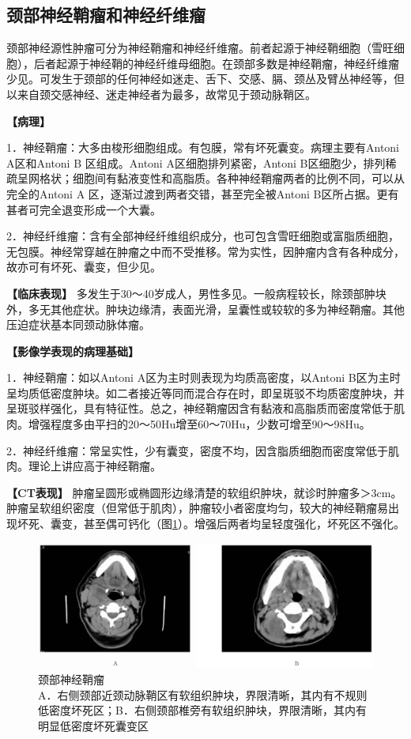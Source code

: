 \subsection{颈部神经鞘瘤和神经纤维瘤}

颈部神经源性肿瘤可分为神经鞘瘤和神经纤维瘤。前者起源于神经鞘细胞（雪旺细胞），后者起源于神经鞘的神经纤维母细胞。在颈部多数是神经鞘瘤，神经纤维瘤少见。可发生于颈部的任何神经如迷走、舌下、交感、膈、颈丛及臂丛神经等，但以来自颈交感神经、迷走神经者为最多，故常见于颈动脉鞘区。

\textbf{【病理】}

1．神经鞘瘤：大多由梭形细胞组成。有包膜，常有坏死囊变。病理主要有Antoni
A区和Antoni B 区组成。Antoni A区细胞排列紧密，Antoni
B区细胞少，排列稀疏呈网格状；细胞间有黏液变性和高脂质。各种神经鞘瘤两者的比例不同，可以从完全的Antoni
A 区，逐渐过渡到两者交错，甚至完全被Antoni
B区所占据。更有甚者可完全退变形成一个大囊。

2．神经纤维瘤：含有全部神经纤维组织成分，也可包含雪旺细胞或富脂质细胞，无包膜。神经常穿越在肿瘤之中而不受推移。常为实性，因肿瘤内含有各种成分，故亦可有坏死、囊变，但少见。

\textbf{【临床表现】}
多发生于30～40岁成人，男性多见。一般病程较长，除颈部肿块外，多无其他症状。肿块边缘清，表面光滑，呈囊性或较软的多为神经鞘瘤。其他压迫症状基本同颈动脉体瘤。

\textbf{【影像学表现的病理基础】}

1．神经鞘瘤：如以Antoni A区为主时则表现为均质高密度，以Antoni
B区为主时呈均质低密度肿块。如二者接近等同而混合存在时，即呈斑驳不均质密度肿块，并呈斑驳样强化，具有特征性。总之，神经鞘瘤因含有黏液和高脂质而密度常低于肌肉。增强程度多由平扫的20～50Hu增至60～70Hu，少数可增至90～98Hu。

2．神经纤维瘤：常呈实性，少有囊变，密度不均，因含脂质细胞而密度常低于肌肉。理论上讲应高于神经鞘瘤。

\textbf{【CT表现】}
肿瘤呈圆形或椭圆形边缘清楚的软组织肿块，就诊时肿瘤多＞3cm。肿瘤呈软组织密度（但常低于肌肉），肿瘤较小者密度均匀，较大的神经鞘瘤易出现坏死、囊变，甚至偶可钙化（图\ref{fig8-4}）。增强后两者均呈轻度强化，坏死区不强化。

\begin{figure}[!htbp]
 \centering
 \includegraphics[width=.7\textwidth,height=\textheight,keepaspectratio]{./images/Image00171.jpg}
 \captionsetup{justification=centering}
 \caption{颈部神经鞘瘤\\{\small A．右侧颈部近颈动脉鞘区有软组织肿块，界限清晰，其内有不规则低密度坏死区；B．右侧颈部椎旁有软组织肿块，界限清晰，其内有明显低密度坏死囊变区}}
 \label{fig8-4}
  \end{figure} 

